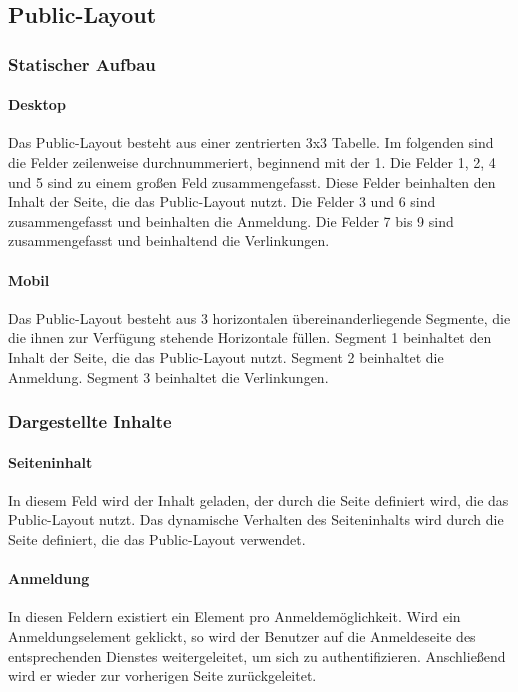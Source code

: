 \subsection{Public-Layout}

\subsubsection{Statischer Aufbau}
\paragraph*{Desktop}
Das Public-Layout besteht aus einer zentrierten 3x3 Tabelle.
Im folgenden sind die Felder zeilenweise durchnummeriert, beginnend mit der 1.
Die Felder 1, 2, 4 und 5 sind zu einem großen Feld zusammengefasst. Diese Felder beinhalten den Inhalt der Seite, die das Public-Layout nutzt. 
Die Felder 3 und 6 sind zusammengefasst und beinhalten die Anmeldung.
Die Felder 7 bis 9 sind zusammengefasst und beinhaltend die Verlinkungen.

\paragraph*{Mobil}
Das Public-Layout besteht aus 3 horizontalen übereinanderliegende Segmente, die die ihnen zur Verfügung stehende Horizontale füllen.
Segment 1 beinhaltet den Inhalt der Seite, die das Public-Layout nutzt. 
Segment 2 beinhaltet die Anmeldung.
Segment 3 beinhaltet die Verlinkungen.

\subsubsection{Dargestellte Inhalte}
\paragraph*{Seiteninhalt}
In diesem Feld wird der Inhalt geladen, der durch die Seite definiert wird, die das Public-Layout nutzt.
Das dynamische Verhalten des Seiteninhalts wird durch die Seite definiert, die das Public-Layout verwendet.

\paragraph*{Anmeldung}
In diesen Feldern existiert ein Element pro Anmeldemöglichkeit.
Wird ein Anmeldungselement geklickt, so wird der Benutzer auf die Anmeldeseite des entsprechenden Dienstes weitergeleitet, um sich zu authentifizieren.
Anschließend wird er wieder zur vorherigen Seite zurückgeleitet.

